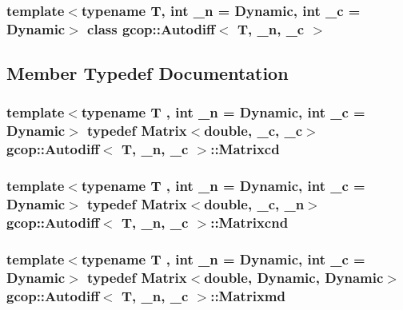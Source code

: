 \subsubsection*{template$<$typename T, int \-\_\-n = \-Dynamic, int \-\_\-c = \-Dynamic$>$ class gcop\-::\-Autodiff$<$ T, \-\_\-n, \-\_\-c $>$}



\subsection{\-Member \-Typedef \-Documentation}
\subsubsection[{\-Matrixcd}]{\setlength{\rightskip}{0pt plus 5cm}template$<$typename T , int \-\_\-n = \-Dynamic, int \-\_\-c = \-Dynamic$>$ typedef \-Matrix$<$double, \-\_\-c, \-\_\-c$>$ {\bf gcop\-::\-Autodiff}$<$ \-T, \-\_\-n, \-\_\-c $>$\-::{\bf \-Matrixcd}}\label{classgcop_1_1Autodiff_a92c40ee19130f9d7b283a296cd4550b0}
\subsubsection[{\-Matrixcnd}]{\setlength{\rightskip}{0pt plus 5cm}template$<$typename T , int \-\_\-n = \-Dynamic, int \-\_\-c = \-Dynamic$>$ typedef \-Matrix$<$double, \-\_\-c, \-\_\-n$>$ {\bf gcop\-::\-Autodiff}$<$ \-T, \-\_\-n, \-\_\-c $>$\-::{\bf \-Matrixcnd}}\label{classgcop_1_1Autodiff_a9c5a36f2f43334c91c03b83b19dfdd0a}
\subsubsection[{\-Matrixmd}]{\setlength{\rightskip}{0pt plus 5cm}template$<$typename T , int \-\_\-n = \-Dynamic, int \-\_\-c = \-Dynamic$>$ typedef \-Matrix$<$double, \-Dynamic, \-Dynamic$>$ {\bf gcop\-::\-Autodiff}$<$ \-T, \-\_\-n, \-\_\-c $>$\-::{\bf \-Matrixmd}}\label{classgcop_1_1Autodiff_a53bc84ec1cb623c3db4bd6d998ae768b}
